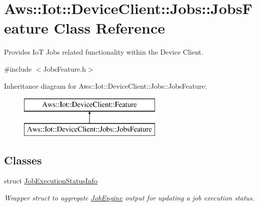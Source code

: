 \hypertarget{class_aws_1_1_iot_1_1_device_client_1_1_jobs_1_1_jobs_feature}{}\section{Aws\+:\+:Iot\+:\+:Device\+Client\+:\+:Jobs\+:\+:Jobs\+Feature Class Reference}
\label{class_aws_1_1_iot_1_1_device_client_1_1_jobs_1_1_jobs_feature}


Provides IoT Jobs related functionality within the Device Client.  




{\ttfamily \#include $<$Jobs\+Feature.\+h$>$}

Inheritance diagram for Aws\+:\+:Iot\+:\+:Device\+Client\+:\+:Jobs\+:\+:Jobs\+Feature\+:\begin{figure}[H]
\begin{center}
\leavevmode
\includegraphics[height=2.000000cm]{class_aws_1_1_iot_1_1_device_client_1_1_jobs_1_1_jobs_feature}
\end{center}
\end{figure}
\subsection*{Classes}
\begin{DoxyCompactItemize}
\item 
struct \hyperlink{struct_aws_1_1_iot_1_1_device_client_1_1_jobs_1_1_jobs_feature_1_1_job_execution_status_info}{Job\+Execution\+Status\+Info}
\begin{DoxyCompactList}\small\item\em Wrapper struct to aggregate \hyperlink{class_aws_1_1_iot_1_1_device_client_1_1_jobs_1_1_job_engine}{Job\+Engine} output for updating a job execution status. \end{DoxyCompactList}\end{DoxyCompactItemize}
